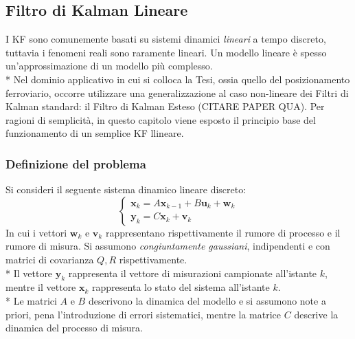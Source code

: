 \subsection{Filtro di Kalman Lineare}
I KF sono comunemente basati su sistemi dinamici \emph{lineari} a tempo discreto, tuttavia i fenomeni reali sono raramente lineari. Un modello lineare \`e spesso un'approssimazione di un modello pi\`u complesso.\\*
Nel dominio applicativo in cui si colloca la Tesi, ossia quello del posizionamento ferroviario, occorre utilizzare una generalizzazione al caso non-lineare dei Filtri di Kalman standard: il Filtro di Kalman Esteso (CITARE PAPER QUA). Per ragioni di semplicit\`a, in questo capitolo viene esposto il principio base del funzionamento di un semplice KF llineare.
\subsubsection{Definizione del problema}
Si consideri il seguente sistema dinamico lineare discreto:
$$
\begin{cases}
\mathbf x_k = A \mathbf x_{k-1} + B \mathbf u_k + \mathbf w_k \\
\mathbf y_k = C \mathbf x_k + \mathbf v_k
\end{cases}
$$
In cui i vettori $\mathbf w_k$ e $\mathbf v_k$ rappresentano rispettivamente il rumore di processo e il rumore di misura. Si assumono \emph{congiuntamente gaussiani}, indipendenti e con matrici di covarianza $Q,R$ rispettivamente.\\*
Il vettore $\mathbf y_k$ rappresenta il vettore di misurazioni campionate all'istante $k$, mentre il vettore $\mathbf x_k$ rappresenta lo stato del sistema all'istante $k$.\\*
Le matrici $A$ e $B$ descrivono la dinamica del modello e si assumono note a priori, pena l'introduzione di errori sistematici, mentre la matrice $C$ descrive la dinamica del processo di misura.